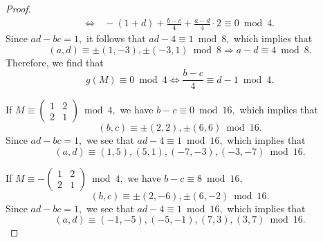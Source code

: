 \documentclass[12pt]{article}
\theoremstyle{definition}
\numberwithin{equation}{section}
\numberwithin{theorem}{section}
\begin{document}
\begin{proof}
\begin{align*}
\Longleftrightarrow& \,
-(1+d)+\frac{b-c}{4}+\frac{a-d}{4}\cdot2\equiv 0 \bmod{4}.
\end{align*}
Since $ad-bc=1,$ it follows that $ad-4\equiv 1 \bmod{8},$ 
which implies that 
\begin{equation*}
(a,d)\equiv 
\pm
(1,-3), 
\pm
(-3,1) \bmod{8} 
\Longrightarrow
a-d\equiv 4 \bmod{8}. 
\end{equation*}
Therefore, we find that 
\begin{equation*}
g(M)\equiv 0 \bmod{4}
\Longleftrightarrow
\frac{b-c}{4} \equiv d-1 \bmod{4}. 
\end{equation*}
\par
If 
$
M
\equiv 
\begin{pmatrix}
1 & 2 \\
2 & 1
\end{pmatrix}
\bmod{4}, 
$ we have 
$
b-c\equiv 0 \bmod{16}, 
$
which implies that 
\begin{equation*}
(b,c)\equiv 
\pm(2,2), 
\pm(6,6) \bmod{16}.
\end{equation*}
Since $ad-bc=1,$ we see that 
$ad-4\equiv 1 \bmod{16},$ 
which implies that 
\begin{equation*}
(a,d)\equiv 
(1,5), (5,1), (-7,-3), (-3,-7) \bmod{16}. 
\end{equation*}
\par
If 
$
M
\equiv 
-
\begin{pmatrix}
1 & 2 \\
2 & 1
\end{pmatrix}
\bmod{4}, 
$ we have 
$
b-c\equiv 8 \bmod{16}, 
$
\begin{equation*}
(b,c)\equiv 
\pm(2,-6), 
\pm(6,-2) \bmod{16}.
\end{equation*}
Since $ad-bc=1,$ we see that 
$ad-4\equiv 1 \bmod{16},$ 
which implies that 
\begin{equation*}
(a,d)\equiv 
(-1,-5), (-5,-1), (7,3), (3,7) \bmod{16}. 
\end{equation*}
\end{proof}
\end{document}
